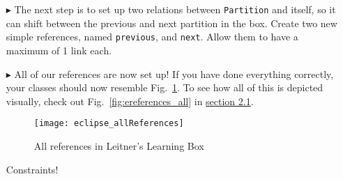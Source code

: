 \begin{itemize}
\item[$\blacktriangleright$] The next step is to set up two relations between \texttt{Partition} and itself, so it can shift between the previous and next
partition in the box. Create two new simple references, named \texttt{previous}, and \texttt{next}. Allow them to have a maximum of 1 link each.

\item[$\blacktriangleright$] All of our references are now set up! If you have done everything correctly, your classes should now resemble Fig.~\ref{fig:allReferences}.
To see how all of this is depicted visually, check out Fig.~\ref{fig:ereferences_all} in \hyperlink{sec:static vis}{section 2.1}.

\begin{figure}[htbp]
	\centering
  \texttt{[image: eclipse\_allReferences]}
	\caption{All references in Leitner's Learning Box}
	\label{fig:allReferences}
\end{figure} 

\newpage
{\huge Constraints!}
\end{itemize}
